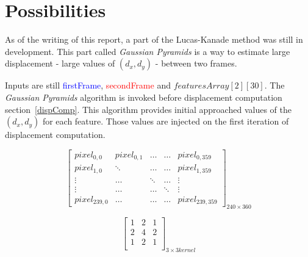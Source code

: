 
\section{Possibilities}

As of the writing of this report, a part of the Lucas-Kanade method was still in development. This part called \emph{Gaussian Pyramids} is a way to estimate large displacement - large values of $(d_{x},d_{y})$ - between two frames.

Inputs are still \textcolor{blue}{firstFrame}, \textcolor{red}{secondFrame} and  $featuresArray[2][30]$. The \emph{Gaussian Pyramids} algorithm is invoked before displacement computation section~\ref{dispComp}. This algorithm provides initial approached values of the $(d_{x},d_{y})$ for each feature. Those values are injected on the first iteration of displacement computation.

\noindent\begin{minipage}{.45\textwidth}
\[
\begin{bmatrix}

pixel_{0,0} & pixel_{0,1} & \ldots & \ldots & pixel_{0,359}\\

pixel_{1,0} & \ddots & \ldots & \ldots & pixel_{1,359}\\

\vdots & \ldots & \ddots & \ldots & \vdots\\

\vdots & \ldots & \ldots & \ddots & \vdots\\

pixel_{239,0} & \ldots & \ldots  & \ldots & pixel_{239,359}

\end{bmatrix}_{240\times 360}
\]
\end{minipage}\hfill
\begin{minipage}{.45\textwidth}
\[
\begin{bmatrix}

1 & 2 & 1\\

2 & 4 & 2\\

1 & 2 & 1\\

\end{bmatrix}_{3\times 3 kernel}
\]
\end{minipage}

